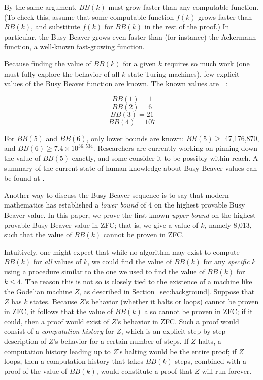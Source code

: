 \documentclass[11pt]{article}
\newcommand{\statenumcomma}{8,013, }
\begin{document}
By the same argument, $BB(k)$ must grow faster than any computable function. (To check this, assume that some computable function $f(k)$ grows faster than $BB(k)$, and substitute $f(k)$ for $BB(k)$ in the rest of the proof.) In particular, the Busy Beaver grows even faster than (for instance) the Ackermann function, a well-known fast-growing function. 

Because finding the value of $BB(k)$ for a given $k$ requires so much work (one must fully explore the behavior of all $k$-state Turing machines), few explicit values of the Busy Beaver function are known. The known values are~\cite{bbsmall}~\cite{bbfour}: 

$$BB(1) = 1$$
$$BB(2) = 6$$
$$BB(3) = 21$$
$$BB(4) = 107$$

For $BB(5)$ and $BB(6)$, only lower bounds are known: $BB(5) \ge$ 47,176,870, and $BB(6) \ge 7.4 \times 10^{36,534}$. Researchers are currently working on pinning down the value of $BB(5)$ exactly, and some consider it to be possibly within reach. A summary of the current state of human knowledge about Busy Beaver values can be found at \cite{bbvalues}.


Another way to discuss the Busy Beaver sequence is to say that modern mathematics has established a \emph{lower bound} of 4 on the highest provable Busy Beaver value. In this paper, we prove the first known \emph{upper bound} on the highest provable Busy Beaver value in ZFC; that is, we give a value of $k$, namely \statenumcomma such that the value of $BB(k)$ cannot be proven in ZFC. 

Intuitively, one might expect that while no algorithm may exist to compute $BB(k)$ for \emph{all} values of $k$, we could find the value of $BB(k)$ for any \emph{specific} $k$ using a procedure similar to the one we used to find the value of $BB(k)$ for $k \le 4$. The reason this is not so is closely tied to the existence of a machine like the G\"{o}delian machine $Z$, as described in Section~\ref{sec:background}. Suppose that $Z$ has $k$ states. Because $Z$'s behavior (whether it halts or loops) cannot be proven in ZFC, it follows that the value of $BB(k)$ also cannot be proven in ZFC; if it could, then a proof would exist of $Z$'s behavior in ZFC. Such a proof would consist of a \emph{computation history} for $Z$, which is an explicit step-by-step description of $Z$'s behavior for a certain number of steps. If $Z$ halts, a computation history leading up to $Z$'s halting would be the entire proof; if $Z$ loops, then a computation history that takes $BB(k)$ steps, combined with a proof of the value of $BB(k)$, would constitute a proof that $Z$ will run forever. 
\end{document}
